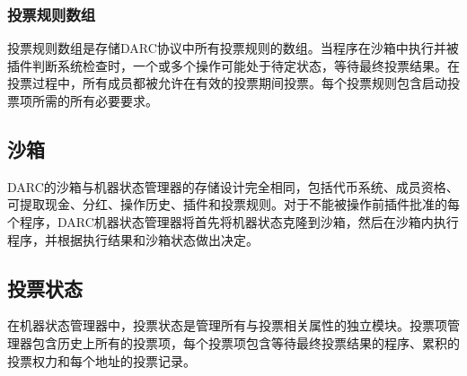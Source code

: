 \documentclass[main.tex]{subfiles}
\begin{document}
\subsubsection{投票规则数组}

投票规则数组是存储DARC协议中所有投票规则的数组。当程序在沙箱中执行并被插件判断系统检查时，一个或多个操作可能处于待定状态，等待最终投票结果。在投票过程中，所有成员都被允许在有效的投票期间投票。每个投票规则包含启动投票项所需的所有必要要求。


\subsection{沙箱}

DARC的沙箱与机器状态管理器的存储设计完全相同，包括代币系统、成员资格、可提取现金、分红、操作历史、插件和投票规则。对于不能被操作前插件批准的每个程序，DARC机器状态管理器将首先将机器状态克隆到沙箱，然后在沙箱内执行程序，并根据执行结果和沙箱状态做出决定。

\subsection{投票状态}

在机器状态管理器中，投票状态是管理所有与投票相关属性的独立模块。投票项管理器包含历史上所有的投票项，每个投票项包含等待最终投票结果的程序、累积的投票权力和每个地址的投票记录。
\end{document}
